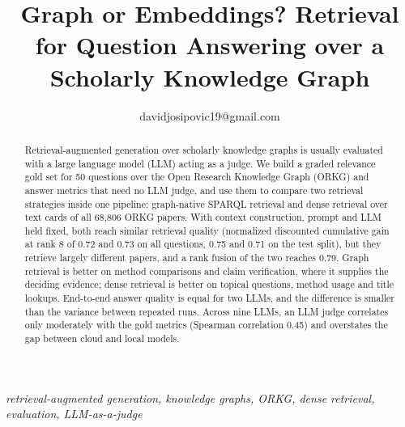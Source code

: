\documentclass{MIPRO}
\begin{document}
\title{Graph or Embeddings? Retrieval for Question Answering over a Scholarly Knowledge Graph}

\author{


davidjosipovic19@gmail.com
}

\maketitle

\begin{abstract}
Retrieval-augmented generation over scholarly knowledge graphs is usually
evaluated with a large language model (LLM) acting as a judge. We build a
graded relevance gold set for 50 questions over the Open Research Knowledge
Graph (ORKG) and answer metrics that need no LLM judge, and use them to compare
two retrieval strategies inside one pipeline: graph-native SPARQL retrieval and
dense retrieval over text cards of all 68,806 ORKG papers. With context
construction, prompt and LLM held fixed, both reach similar retrieval quality
(normalized discounted cumulative gain at rank 8 of 0.72 and 0.73 on all
questions, 0.75 and 0.71 on the test split), but they retrieve largely
different papers, and a rank fusion of the two reaches 0.79. Graph retrieval is
better on method comparisons and claim verification, where it supplies the
deciding evidence; dense retrieval is better on topical questions, method usage
and title lookups. End-to-end answer quality is equal for two LLMs, and the
difference is smaller than the variance between repeated runs. Across nine
LLMs, an LLM judge correlates only moderately with the gold metrics (Spearman
correlation 0.45) and overstates the gap between cloud and local models.
\end{abstract}

\renewcommand\IEEEkeywordsname{Keywords}
\begin{IEEEkeywords}
\textit{retrieval-augmented generation, knowledge graphs, ORKG, dense retrieval, evaluation, LLM-as-a-judge}
\end{IEEEkeywords}













\end{document}
